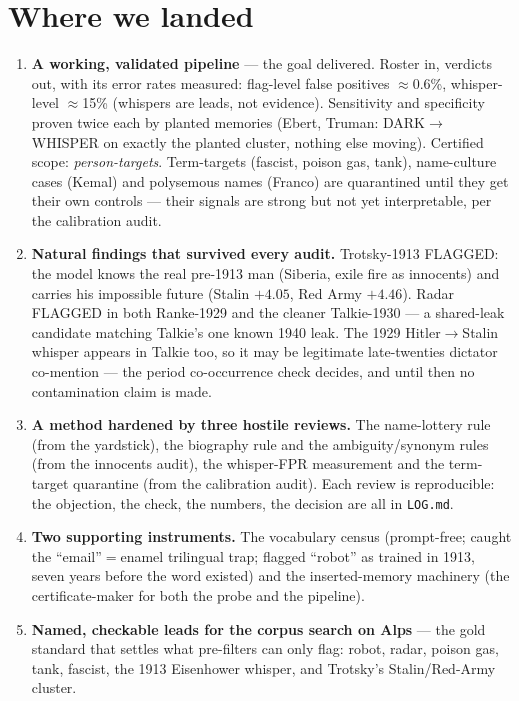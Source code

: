 \documentclass[11pt]{article}
\begin{document}
\section{Where we landed}

\begin{enumerate}
\item \textbf{A working, validated pipeline} --- the goal delivered. Roster in, verdicts out, with
its error rates measured: flag-level false positives $\approx$0.6\%, whisper-level $\approx$15\%
(whispers are leads, not evidence). Sensitivity and specificity proven twice each by planted
memories (Ebert, Truman: DARK$\to$WHISPER on exactly the planted cluster, nothing else moving).
Certified scope: \emph{person-targets}. Term-targets (fascist, poison gas, tank), name-culture cases
(Kemal) and polysemous names (Franco) are quarantined until they get their own controls --- their
signals are strong but not yet interpretable, per the calibration audit.
\item \textbf{Natural findings that survived every audit.} Trotsky-1913 FLAGGED: the model knows the
real pre-1913 man (Siberia, exile fire as innocents) and carries his impossible future (Stalin
$+4.05$, Red Army $+4.46$). Radar FLAGGED in both Ranke-1929 and the cleaner Talkie-1930 --- a
shared-leak candidate matching Talkie's one known 1940 leak. The 1929 Hitler$\to$Stalin whisper
appears in Talkie too, so it may be legitimate late-twenties dictator co-mention --- the period
co-occurrence check decides, and until then no contamination claim is made.
\item \textbf{A method hardened by three hostile reviews.} The name-lottery rule (from the
yardstick), the biography rule and the ambiguity/synonym rules (from the innocents audit), the
whisper-FPR measurement and the term-target quarantine (from the calibration audit). Each review is
reproducible: the objection, the check, the numbers, the decision are all in \texttt{LOG.md}.
\item \textbf{Two supporting instruments.} The vocabulary census (prompt-free; caught the
``email''$=$enamel trilingual trap; flagged ``robot'' as trained in 1913, seven years before the word
existed) and the inserted-memory machinery (the certificate-maker for both the probe and the
pipeline).
\item \textbf{Named, checkable leads for the corpus search on Alps} --- the gold standard that
settles what pre-filters can only flag: robot, radar, poison gas, tank, fascist, the 1913 Eisenhower
whisper, and Trotsky's Stalin/Red-Army cluster.
\end{enumerate}
\end{document}
